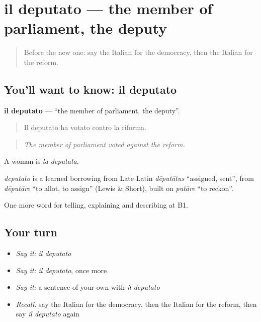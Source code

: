 \section[il deputato]{il deputato — the member of parliament, the deputy}

\label{lesson:IT-C370-deputato}



\begin{quote}
Before the new one: say the Italian for the democracy, then the Italian for the reform.
\end{quote}

\subsection*{You'll want to know: il deputato}
\textbf{il deputato} — \textquotedblleft{}the member of parliament, the deputy\textquotedblright{}.

\begin{quote}
Il deputato ha votato contro la riforma.
\end{quote}

\begin{quote}
\emph{The member of parliament voted against the reform.}
\end{quote}

A woman is \emph{la deputata}.

\begin{cousinweb}
\emph{deputato} is a learned borrowing from Late Latin \emph{dēputātus} \textquotedblleft{}assigned, sent\textquotedblright{}, from \emph{dēputāre} \textquotedblleft{}to allot, to assign\textquotedblright{} (Lewis \& Short), built on \emph{putāre} \textquotedblleft{}to reckon\textquotedblright{}.
\end{cousinweb}

\begin{grammarlens}[title={What you've built}]
One more word for telling, explaining and describing at B1.
\end{grammarlens}

\subsection*{Your turn}
\begin{itemize}
\raggedright
  \item \emph{Say it:} \emph{il deputato}
  \item \emph{Say it:} \emph{il deputato}, once more
  \item \emph{Say it:} a sentence of your own with \emph{il deputato}
  \item \emph{Recall:} say the Italian for the democracy, then the Italian for the reform, then say \emph{il deputato} again
\end{itemize}

